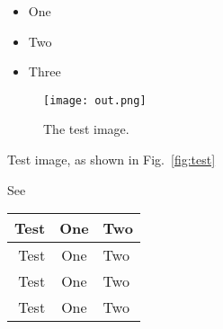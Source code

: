 \begin{itemize}
\item One
\item Two
\item Three
\end{itemize}

\begin{figure}
\centering
\texttt{[image: out.png]}
\caption{\label{fig:test} The test image.}
\end{figure}

Test image, as shown in Fig.~\vref{fig:test}

See \cite{Zott_Reinke_Delaney_Boult_2013}

\begin{table}[t]
\centering
\begin{tabular}{r|c l}
Test & One & Two \\
\hline
Test & One & Two \\Test & One & Two \\Test & One & Two \\
\end{tabular}
\end{table}


